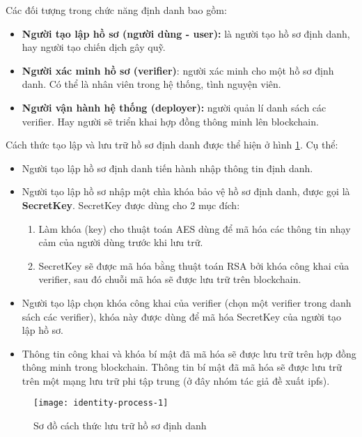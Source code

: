 \documentclass[../main-report.tex]{subfiles}
\begin{document}
Các đối tượng trong chức năng định danh bao gồm:

\begin{itemize}
\item \textbf{Người tạo lập hồ sơ (người dùng - user):} là người tạo hồ sơ định danh, hay người tạo chiến dịch gây quỹ.
\item \textbf{Người xác minh hồ sơ (verifier)}: người xác minh cho một hồ sơ định danh. Có thể là nhân viên trong hệ thống, tình nguyện viên.
\item \textbf{Người vận hành hệ thống (deployer):} người quản lí danh sách các verifier. Hay người sẽ triển khai hợp đồng thông minh lên \gls{blockchain}.
\end{itemize}

Cách thức tạo lập và lưu trữ hồ sơ định danh được thể hiện ở hình \ref{fig:identity-process-1}. Cụ thể:

\begin{itemize}
\item Người tạo lập hồ sơ định danh tiến hành nhập thông tin định danh.
\item Người tạo lập hồ sơ nhập một chìa khóa bảo vệ hồ sơ định danh, được gọi là \textbf{SecretKey}. SecretKey được dùng cho 2 mục đích:
\begin{enumerate}[label=(\roman*)]
\item Làm khóa (key) cho thuật toán AES dùng để mã hóa các thông tin nhạy cảm của người dùng trước khi lưu trữ.
\item SecretKey sẽ được mã hóa bằng thuật toán RSA bởi khóa công khai của verifier, sau đó chuỗi mã hóa sẽ được lưu trữ trên \gls{blockchain}.
\end{enumerate}
\item Người tạo lập chọn khóa công khai của verifier (chọn một verifier trong danh sách các verifier), khóa này được dùng để mã hóa SecretKey của người tạo lập hồ sơ.
\item Thông tin công khai và khóa bí mật đã mã hóa sẽ được lưu trữ trên hợp đồng thông minh trong blockchain. Thông tin bí mật đã mã hóa sẽ được lưu trữ trên một mạng lưu trữ phi tập trung (ở đây nhóm tác giả đề xuất \acrshort{ipfs}).
\end{itemize}

\begin{figure}[ht!]
\begin{center}
\label{fig:identity-process-1}
\texttt{[image: identity-process-1]}
\caption{Sơ đồ cách thức lưu trữ hồ sơ định danh}
\end{center}
\end{figure}
\end{document}
